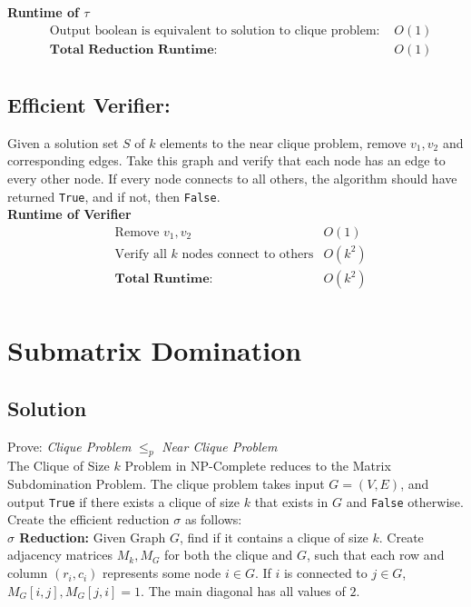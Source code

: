 \documentclass[11pt]{article}
\begin{document}
\textbf{Runtime of $\tau$ }
\begin{align*}
&\text{Output boolean is equivalent to solution to clique problem: } &O(1)\\ 
&\textbf{Total Reduction Runtime: } &O(1)\\
\end{align*}


\subsection{Efficient Verifier:}
Given a solution set $S$ of $k$ elements to the near clique problem, remove $v_1,v_2$ and corresponding edges. Take this graph and verify that each node has an edge to every other node. If every node connects to all others, the algorithm should have returned \texttt{True}, and if not, then \texttt{False}. \\

\textbf{Runtime of Verifier }
\begin{align*}
&\text{Remove $v_1,v_2$}&O(1)\\
&\text{Verify all $k$ nodes connect to others} &O(k^2)\\ 
&\textbf{Total Runtime: } &O(k^2)\\
\end{align*}

\lobsectionbreak

\section{Submatrix Domination}
\lobwatermark

\subsection{Solution}

Prove: \textit{Clique Problem} $\leq_p$ \textit{Near Clique Problem}\\

The Clique of Size $k$ Problem in NP-Complete reduces to the Matrix Subdomination Problem. The  clique problem takes input $G = (V,E)$, and output \texttt{True} if there exists a clique of size $k$ that exists in $G$ and \texttt{False} otherwise. Create the efficient reduction $\sigma$ as follows: \\

\textbf{$\sigma$ Reduction:}
Given Graph $G$, find if it contains a clique of size $k$. Create adjacency matrices $M_k, M_G$ for both the clique and $G$, such that each row and column $(r_i,c_i)$ represents some node $i \in G$. If $i$ is connected to $j \in G$, $M_G[i,j],M_G[j,i] = 1$. The main diagonal has all values of $2$.  \\
\end{document}
